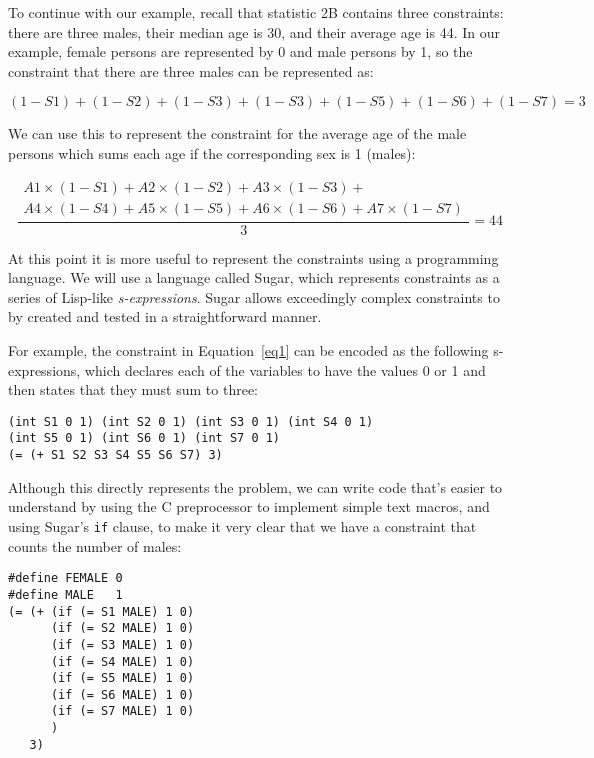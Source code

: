 \documentclass[runningheads]{llncs}
\begin{document}
To continue with our example, recall that statistic 2B contains three
constraints: there are three males, their median age is 30, and their
average age is 44. In our example, female persons
are represented by 0
and male persons by 1, so the constraint that there are three males can be represented as:

\begin{equation}
(1-S1) + (1-S2) + (1-S3) + (1-S3) + (1-S5) + (1-S6) + (1-S7) = 3
\end{equation}

We can use this to represent the constraint for the average age of the
male persons which sums each age if the corresponding sex is 1 (males):

\begin{equation}
\frac{
  \begin{split}
  A1 \times (1-S1) + A2 \times (1-S2) + A3 \times (1-S3) + \\
   A4 \times (1-S4) + A5 \times (1-S5) + A6 \times (1-S6) + A7 \times (1-S7)
  \end{split}
}{3} = 44
\end{equation}

At this point it is more useful to represent the constraints using a
programming language. We will use a language called Sugar\cite{sugar},
which represents constraints as a series of Lisp-like
\textit{s-expressions}\cite{McCarthy:1960:RFS:367177.367199}. Sugar
allows exceedingly complex constraints to by created and tested in a
straightforward manner. 

For example, the constraint in Equation~\ref{eq1} can be encoded as the following
s-expressions, which declares each of the variables to have the values
0 or 1 and then states that they must sum to three:
\begin{Verbatim}
(int S1 0 1) (int S2 0 1) (int S3 0 1) (int S4 0 1)
(int S5 0 1) (int S6 0 1) (int S7 0 1)
(= (+ S1 S2 S3 S4 S5 S6 S7) 3)
\end{Verbatim}

Although this directly represents the problem, we can write code
that's easier to understand by using the C preprocessor to implement
simple text macros, and using Sugar's \texttt{if} clause, to make it
very clear that we have a constraint that counts the number of males:

\begin{Verbatim}
#define FEMALE 0
#define MALE   1
(= (+ (if (= S1 MALE) 1 0)  
      (if (= S2 MALE) 1 0)
      (if (= S3 MALE) 1 0)
      (if (= S4 MALE) 1 0)
      (if (= S5 MALE) 1 0)
      (if (= S6 MALE) 1 0)
      (if (= S7 MALE) 1 0)
      )
   3)
\end{Verbatim}
\end{document}
